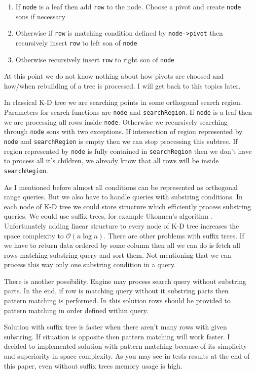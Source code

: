 \documentclass[10pt,a4paper]{article}
\newcommand{\Oh}{\mathcal{O}}
\begin{document}
\begin{enumerate}
\item If \verb|node| is a leaf then add \verb|row| to the node. Choose a pivot and create \verb|node| sons if necessary
\item Otherwise if \verb|row| is matching condition defined by \verb|node->pivot| then recursively insert \verb|row| to left son of \verb|node|
\item Otherwise recursively insert \verb|row| to right son of \verb|node|
\end{enumerate}

At this point we do not know nothing about how pivots are choosed and how/when rebuilding of a tree is processed. I will get back to this topics later.

In classical K-D tree we are searching points in some orthogonal search region. Parameters for search functions are \verb|node| and \verb|searchRegion|. If \verb|node| is a leaf then we are processing all rows inside \verb|node|. Otherwise we recursively searching through \verb|node| sons with two exceptions. If intersection of region represented by \verb|node| and \verb|searchRegion| is empty then we can stop processing this subtree. If region represented by \verb|node| is fully contained in \verb|searchRegion| then we don't have to process all it's children, we already know that all rows will be inside \verb|searchRegion|.

As I mentioned before almost all conditions can be represented as orthogonal range queries. But we also have to handle queries with substring conditions. In each node of K-D tree we could store structure which efficiently process substring queries. We could use suffix trees, for example Ukonnen's algorithm \cite{STUKK}. Unfortunately adding linear structure to every node of K-D tree increases the space complexity to $\Oh(n \log n)$. There are other problems with suffix trees. If we have to return data ordered by some column then all we can do is fetch all rows matching substring query and sort them. Not mentioning that we can process this way only one substring condition in a query.

There is another possibility. Engine may process search query without substring parts. In the end, if row is matching query without it substring parts then pattern matching is performed. In this solution rows should be provided to pattern matching in order defined within query.

Solution with suffix tree is faster when there aren't many rows with given substring. If situation is opposite then pattern matching will work faster. I decided to implemented solution with pattern matching because of its simplicity and superiority in space complexity. As you may see in tests results at the end of this paper, even without suffix trees memory usage is high. 
\end{document}
